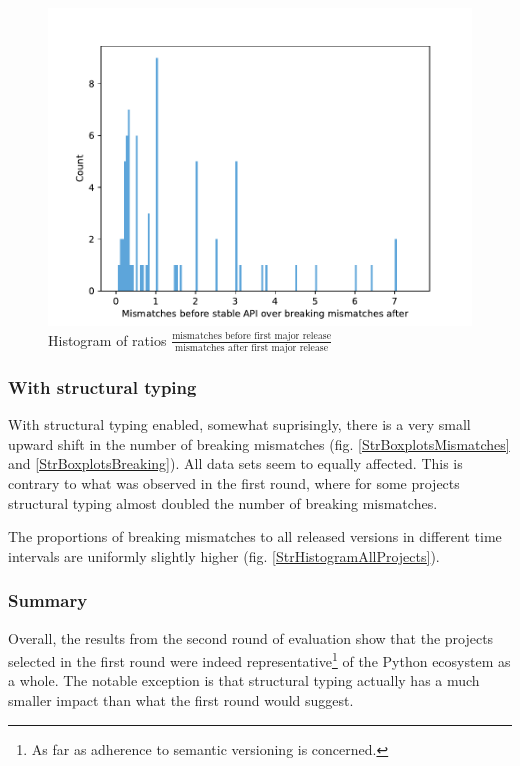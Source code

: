 \documentclass{l4proj}
\begin{document}
\begin{figure}[H]
\centering
\caption{Histogram of ratios $\frac{\text{mismatches before first
major release}}{\text{mismatches after first major release}}$}
\label{StableBoundaryRatio}
\includegraphics[height=0.3\textheight]{images/evaluation/ls_stable_boundary}
\end{figure}

\subsubsection{With structural typing}

With structural typing enabled, somewhat suprisingly, there is a very
small upward shift in the number of breaking mismatches (fig.
\ref{StrBoxplotsMismatches} and \ref{StrBoxplotsBreaking}). All data
sets seem to equally affected. This is contrary to what was observed
in the first round, where for some projects structural typing almost
doubled the number of breaking mismatches.

The proportions of breaking mismatches to all released versions in
different time intervals are uniformly slightly higher (fig.
\ref{StrHistogramAllProjects}).

\subsubsection{Summary}

Overall, the results from the second round of evaluation show that the
projects selected in the first round were indeed
representative\footnote{As far as adherence to semantic versioning is
concerned.} of the Python ecosystem as a whole. The notable exception
is that structural typing actually has a much smaller impact than what
the first round would suggest.
\end{document}
